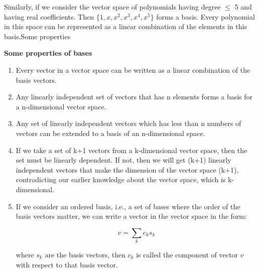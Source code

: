 Similarly, if we consider the vector space of polynomials having degree $\leq $ 5 and having real coefficients. Then $\{1,x,x^2,x^3,x^4,x^5\}$ forms a basis. Every polynomial in this space can be represented as a linear combination of the elements in this basis.Some properties 


\textbf{Some properties of bases}
\begin{enumerate}
    \item Every vector in a vector space can be written as a linear combination of the basis vectors. 
    \item Any linearly independent set of vectors that has n elements forms a basis for a n-dimensional vector space.
    \item Any set of linearly independent vectors which has less than n numbers of vectors can be extended to a basis of an n-dimensional space. 
    \item If we take a set of k+1 vectors from a k-dimensional vector space, then the set must be linearly dependent. If not, then we will get (k+1) linearly independent vectors that make the dimension of the vector space (k+1), contradicting our earlier knowledge about the vector space, which is k-dimensional. 

    \item If we consider an ordered basis, i.e., a set of bases where the order of the basis vectors matter, we can write a vector in the vector space in the form:

    $$v=\sum_k c_k s_k$$

    where $s_k$ are the basis vectors, then $c_k$ is called the component of vector $v$ with respect to that basis vector.



    
\end{enumerate}